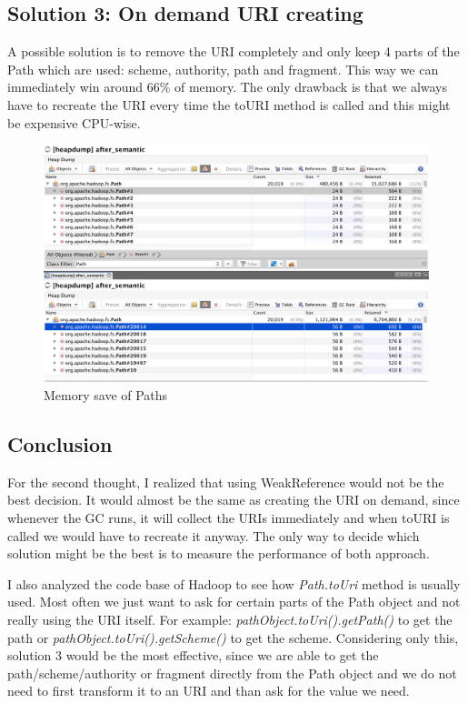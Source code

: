 \subsection{Solution 3: On demand URI creating}
A possible solution is to remove the URI completely and only keep 4 parts of the Path which are used: scheme, authority, path and fragment. This way we can immediately win around 66\% of memory. The only drawback is that we always have to recreate the URI every time the toURI method is called and this might be expensive CPU-wise.

\begin{figure}[H]
	\includegraphics[width=150mm, keepaspectratio]{figures/path_before_after.png}
	\centering
	\caption{Memory save of Paths}
\end{figure}

\subsection{Conclusion}
For the second thought, I realized that using WeakReference would not be the best decision. It would almost be the same as creating the URI on demand, since whenever the GC runs, it will collect the URIs immediately and when toURI is called we would have to recreate it anyway. The only way to decide which solution might be the best is to measure the performance of both approach. 

I also analyzed the code base of Hadoop to see how \textit{Path.toUri} method is usually used. Most often we just want to ask for certain parts of the Path object and not really using the URI itself. For example: \textit{pathObject.toUri().getPath()} to get the path or \textit{pathObject.toUri().getScheme()} to get the scheme. Considering only this, solution 3 would be the most effective, since we are able to get the path/scheme/authority or fragment directly from the Path object and we do not need to first transform it to an URI and than ask for the value we need. 

